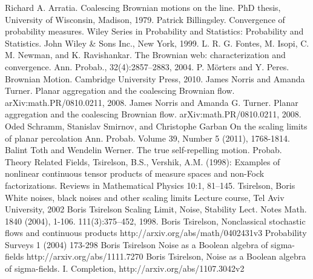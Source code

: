 \begin{thebibliography}{99}
 Richard A. Arratia. Coalescing Brownian motions on
  the line. PhD thesis, University of Wisconsin, Madison, 1979.
 Patrick Billingsley. Convergence of probability
  measures. Wiley Series in Probability and Statistics: Probability
  and Statistics. John Wiley \& Sons Inc., New York, 1999.
 L. R. G. Fontes, M. Isopi, C. M. Newman, and
  K. Ravishankar. The Brownian web: characterization and
  convergence. Ann. Probab., 32(4):2857--2883, 2004.
 P. M\"orters and Y. Peres. Brownian Motion.
  Cambridge University Press, 2010.
 James Norris and Amanda
  Turner. Planar aggregation and the coalescing Brownian flow.
  arXiv:math.PR/0810.0211, 2008.
 James Norris and Amanda
  G. Turner. Planar aggregation and the coalescing Brownian
  flow. arXiv:math.PR/0810.0211, 2008.
  Oded Schramm, Stanislav Smirnov, and Christophe Garban
  On the scaling limits of planar percolation
  Ann. Probab. Volume 39, Number 5 (2011), 1768-1814.
 Balint Toth and Wendelin Werner. The true
  self-repelling motion. Probab. Theory Related Fields,
  Tsirelson, B.S., Vershik, A.M. (1998): Examples of nonlinear continuous
  tensor products of measure spaces and non-Fock factorizations. Reviews
  in Mathematical Physics 10:1, 81--145.
  Tsirelson, Boris
  White noises, black noises and other scaling limits
  Lecture course, Tel Aviv University, 2002
  Boris Tsirelson
  Scaling Limit, Noise, Stability
  Lect. Notes Math. 1840 (2004), 1-106.
  111(3):375--452, 1998.
 Boris Tsirelson,
  Nonclassical stochastic flows and continuous products
  http://arxiv.org/abs/math/0402431v3
  Probability Surveys 1 (2004) 173-298
  Boris Tsirelson
  Noise as a Boolean algebra of sigma-fields
  http://arxiv.org/abs/1111.7270
 Boris Tsirelson, Noise as a Boolean
  algebra of sigma-fields. I. Completion, http://arxiv.org/abs/1107.3042v2
\end{thebibliography}
